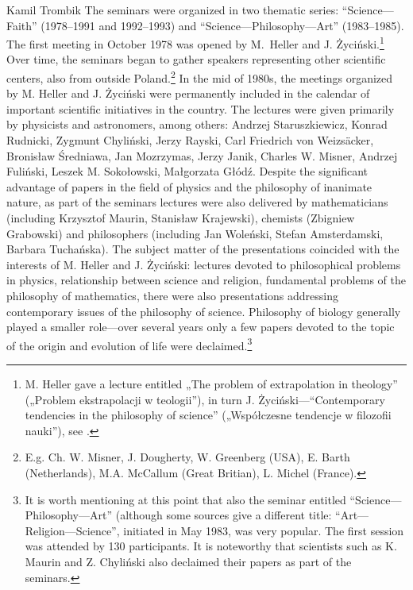 \begin{artengenv}{Kamil Trombik}
The seminars were organized in two thematic series: ``Science---Faith'' (1978--1991 and 1992--1993) and
``Science---Philosophy---Art'' (1983--1985). The first meeting in October 1978 was opened by M.~Heller and J.
Życiński.\footnote{M. Heller gave a lecture entitled „The problem of extrapolation in theology'' („Problem
ekstrapolacji w teologii''), in turn J. Życiński---``Contemporary tendencies in the philosophy of science'' („Współczesne
tendencje w filozofii nauki''), see
\parencite[p.133]{liana_z_1999}.
} Over time, the seminars
began to gather speakers representing other scientific centers, also from outside Poland.\footnote{E.g. Ch. W. Misner,
J. Dougherty, W. Greenberg (USA), E. Barth (Netherlands), M.A. McCallum (Great Britian), L. Michel (France).} In the
mid of 1980s, the meetings organized by M. Heller and J. Życiński were permanently included in the calendar of
important scientific initiatives in the country. The lectures were given primarily by physicists and astronomers, among
others: Andrzej Staruszkiewicz, Konrad Rudnicki, Zygmunt Chyliński, Jerzy Rayski, Carl Friedrich von
Weizsäcker, Bronisław Średniawa, Jan Mozrzymas,
Jerzy Janik, Charles W. Misner, Andrzej Fuliński, Leszek M. Sokołowski, Małgorzata Głódź. Despite the significant
advantage of papers in the field of physics and the philosophy of inanimate nature, as part of the seminars lectures
were also delivered by mathematicians (including Krzysztof Maurin, Stanisław Krajewski), chemists (Zbigniew Grabowski)
and philosophers (including Jan Woleński, Stefan Amsterdamski, Barbara Tuchańska). The subject matter of the
presentations coincided with the interests of M. Heller and J. Życiński: lectures devoted to philosophical problems in
physics, relationship between science and religion, fundamental problems of the philosophy of mathematics, there were
also presentations addressing contemporary issues of the philosophy of science. Philosophy of biology generally played
a smaller role---over several years only a few papers devoted to the topic of the origin and evolution of life were
declaimed.\footnote{It is worth mentioning at this point that also the seminar entitled ``Science---Philosophy---Art''
(although some sources give a different title: ``Art---Religion---Science'', initiated in May 1983, was very popular. The
first session was attended by 130 participants. It is noteworthy that scientists such as K. Maurin and Z. Chyliński
also declaimed their papers as part of the seminars. }


\end{artengenv}
